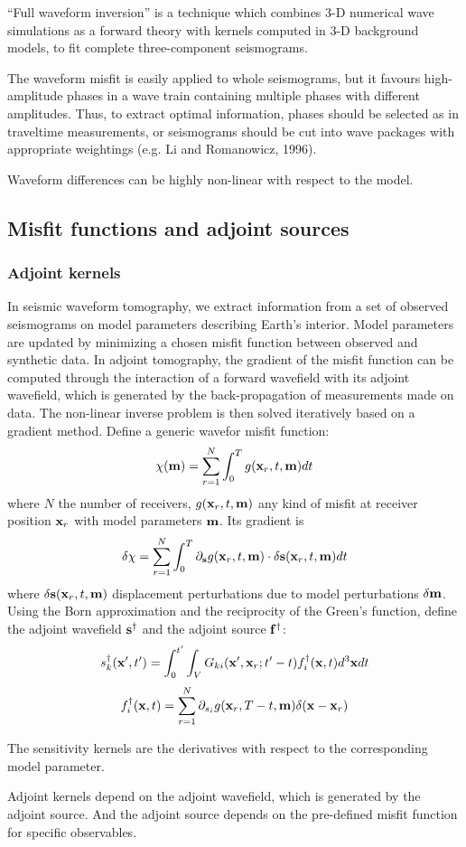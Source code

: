  ``Full waveform inversion'' is a technique which combines 3-D numerical wave simulations as a forward theory with \Frechet kernels computed in 3-D background models, to fit complete three-component seismograms.\par
{} The waveform misfit is easily applied to whole seismograms, but it favours high-amplitude phases in a wave train containing multiple phases with different amplitudes. Thus, to extract optimal information, phases should be selected as in traveltime measurements, or seismograms should be cut into wave packages with appropriate weightings (e.g. Li and Romanowicz, 1996).\par
Waveform differences can be highly non-linear with respect to the model.\par
\subsection{Misfit functions and adjoint sources}
\subsubsection{Adjoint kernels}
 In seismic waveform tomography, we extract information from a set of observed seismograms on model parameters describing Earth's interior. Model parameters are updated by minimizing a chosen misfit function between observed and synthetic data. In adjoint tomography, the gradient of the misfit function can be computed through the interaction of a forward wavefield with its adjoint wavefield, which is generated by the back-propagation of measurements made on data. The non-linear inverse problem is then solved iteratively based on a gradient method.
Define a generic wavefor misfit function:
\[ \chi(\mathbf{m})=\sum_{r=1}^N\int_0^Tg(\mathbf{x}_r,t,\mathbf{m})dt \]
where $N$ the number of receivers, $g(\mathbf{x}_r,t,\mathbf{m})$ any kind of misfit at receiver position $\mathbf{x}_r$ with model parameters $\mathbf{m}$. Its gradient is
\[ \delta\chi=\sum_{r=1}^N\int_0^T\partial_{\mathbf{s}}g(\mathbf{x}_r,t,\mathbf{m})\cdot\delta\mathbf{s}(\mathbf{x}_r,t,\mathbf{m})dt \]
where $\delta\mathbf{s}(\mathbf{x}_r,t,\mathbf{m})$ displacement perturbations due to model perturbations $\delta\mathbf{m}$. Using the Born approximation and the reciprocity of the Green's function, define the adjoint wavefield $\mathbf{s}^\dagger$ and the adjoint source $\mathbf{f}^\dagger$:
\[ s_k^\dagger(\mathbf{x}',t')=\int_0^{t'}\int_VG_{ki}(\mathbf{x}',\mathbf{x}_r;t'-t)f_i^\dagger(\mathbf{x},t)d^3\mathbf{x}dt \]
\[ f_i^\dagger(\mathbf{x},t)=\sum_{r=1}^N\partial_{s_i}g(\mathbf{x}_r,T-t,\mathbf{m})\delta(\mathbf{x}-\mathbf{x}_r) \]\par
The sensitivity kernels are the \Frechet derivatives with respect to the corresponding model parameter.\par
Adjoint kernels depend on the adjoint wavefield, which is generated by the adjoint source. And the adjoint source depends on the pre-defined misfit function for specific observables.\par
